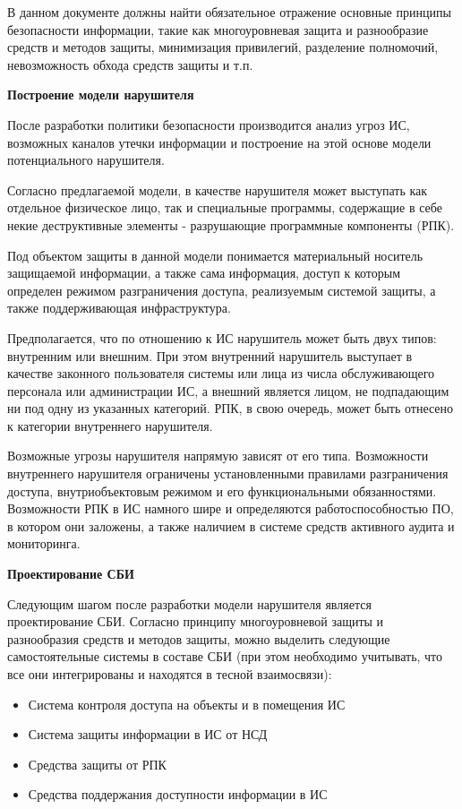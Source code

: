 В данном документе должны найти обязательное отражение основные принципы безопасности информации,
такие как многоуровневая защита и разнообразие средств и методов защиты, минимизация привилегий, разделение полномочий,
невозможность обхода средств защиты и т.п.

\bigbreak
\textbf{Построение модели нарушителя}

После разработки политики безопасности производится анализ угроз ИС, возможных каналов утечки информации и
построение на этой основе модели потенциального нарушителя.

Согласно предлагаемой модели, в качестве нарушителя может выступать как отдельное физическое лицо,
так и специальные программы, содержащие в себе некие деструктивные элементы - разрушающие программные компоненты (РПК).

Под объектом защиты в данной модели понимается материальный носитель защищаемой информации, а также сама информация,
доступ к которым определен режимом разграничения доступа, реализуемым системой защиты, а также поддерживающая инфраструктура.

Предполагается, что по отношению к ИС нарушитель может быть двух типов: внутренним или внешним.
При этом внутренний нарушитель выступает в качестве законного пользователя системы или лица из числа
обслуживающего персонала или администрации ИС, а внешний является лицом, не подпадающим ни под
одну из указанных категорий. РПК, в свою очередь, может быть отнесено к категории внутреннего нарушителя.

Возможные угрозы нарушителя напрямую зависят от его типа. Возможности внутреннего нарушителя ограничены
установленными правилами разграничения доступа, внутриобъектовым режимом и его функциональными обязанностями.
Возможности РПК в ИС намного шире и определяются работоспособностью ПО, в котором они заложены,
а также наличием в системе средств активного аудита и мониторинга.

\bigbreak
\textbf{Проектирование СБИ}

Следующим шагом после разработки модели нарушителя является проектирование СБИ.
Согласно принципу многоуровневой защиты и разнообразия средств и методов защиты, можно выделить следующие
самостоятельные системы в составе СБИ (при этом необходимо учитывать, что все они интегрированы
и находятся в тесной взаимосвязи):
\begin{itemize}
    \item Система контроля доступа на объекты и в помещения ИС
    \item Система защиты информации в ИС от НСД
    \item Средства защиты от РПК
    \item Средства поддержания доступности информации в ИС
\end{itemize}

